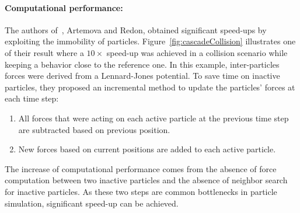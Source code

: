 \paragraph*{Computational performance:}
The authors of~\cite{Artemova2012}, Artemova and Redon, obtained significant speed-ups by exploiting the immobility of particles. Figure~\ref{fig:cascadeCollision} illustrates one of their result where a $10\times$ speed-up was achieved in a collision scenario while keeping a behavior close to the reference one. In this example, inter-particles forces were derived from a Lennard-Jones potential. To save time on inactive particles, they proposed an incremental method to update the particles' forces at each time step:
\begin{enumerate}
    \item All forces that were acting on each active particle at the previous time step are subtracted based on previous position.
    \item New forces based on current positions are added to each active particle.
\end{enumerate}
The increase of computational performance comes from the absence of force computation between
two inactive particles and the absence of neighbor search for inactive particles.
As these two steps are common bottlenecks in particle simulation, significant speed-up can be achieved.

